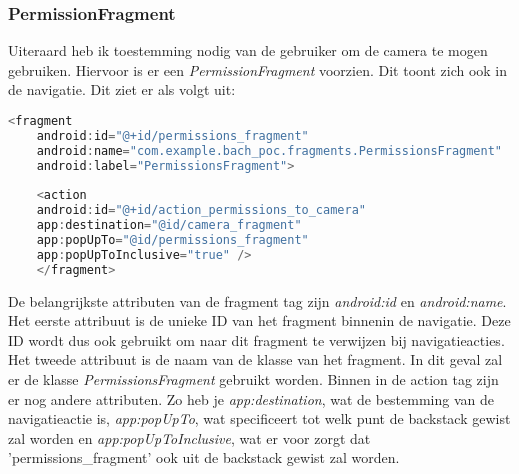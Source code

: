 \subsubsection{PermissionFragment}
Uiteraard heb ik toestemming nodig van de gebruiker om de camera te mogen gebruiken. Hiervoor is er een \emph{PermissionFragment} voorzien. Dit toont zich ook in de navigatie. Dit ziet er als volgt uit:
\begin{lstlisting}[language=Kotlin, caption=PermissionFragment]
    <fragment
    android:id="@+id/permissions_fragment"
    android:name="com.example.bach_poc.fragments.PermissionsFragment"
    android:label="PermissionsFragment">
    
    <action
    android:id="@+id/action_permissions_to_camera"
    app:destination="@id/camera_fragment"
    app:popUpTo="@id/permissions_fragment"
    app:popUpToInclusive="true" />
    </fragment>
\end{lstlisting}
De belangrijkste attributen van de fragment tag zijn \emph{android:id} en \emph{android:name}. Het eerste attribuut is de unieke ID van het fragment binnenin de navigatie. Deze ID wordt dus ook gebruikt om naar dit fragment te verwijzen bij navigatieacties. Het tweede attribuut is de naam van de klasse van het fragment. In dit geval zal er de klasse \emph{PermissionsFragment} gebruikt worden. Binnen in de action tag zijn er nog andere attributen. Zo heb je \emph{app:destination}, wat de bestemming van de navigatieactie is, \emph{app:popUpTo}, wat specificeert tot welk punt de backstack gewist zal worden en \emph{app:popUpToInclusive}, wat er voor zorgt dat 'permissions\_fragment' ook uit de backstack gewist zal worden.

